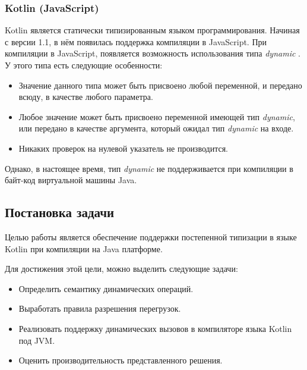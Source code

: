 \subsubsection{Kotlin (JavaScript)}
Kotlin является статически типизированным языком программирования. Начиная с версии 1.1, в нём появилась 
поддержка компиляции в JavaScript. При компиляции в JavaScript, появляется возможность использования типа \textit{dynamic} \cite{kotlin:dynamicType}. У этого типа есть следующие особенности:

\begin{itemize}
    \item Значение данного типа может быть присвоено любой переменной, и передано всюду, в качестве любого параметра.
    \item Любое значение может быть присвоено переменной имеющей тип \textit{dynamic}, или передано в качестве аргумента, который ожидал тип \textit{dynamic} на входе.
    \item Никаких проверок на нулевой указатель не производится.
\end{itemize}

Однако, в настоящее время, тип \textit{dynamic} не поддерживается при компиляции в байт-код виртуальной машины Java.



\subsection{Постановка задачи}

Целью работы является обеспечение поддержки постепенной типизации в языке Kotlin
при компиляции на Java платформе.

Для достижения этой цели, можно выделить следующие задачи:
\begin{itemize}
    \item Определить семантику динамических операций.
    \item Выработать правила разрешения перегрузок.
    \item Реализовать поддержку динамических вызовов в компиляторе языка Kotlin под JVM.
    \item Оценить производительность представленного решения.
\end{itemize}

